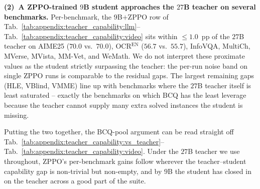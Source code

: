 \textbf{(2)~A ZPPO-trained $9$B student approaches the $27$B teacher on several benchmarks.} Per-benchmark, the $9$B$+$ZPPO row of Tab.~\ref{tab:appendix:teacher_capability:llm}--Tab.~\ref{tab:appendix:teacher_capability:video} sits within ${\le}1.0$~pp of the $27$B teacher on AIME25 ($70.0$ vs.\ $70.0$), OCR$^\text{EN}$ ($56.7$ vs.\ $55.7$), InfoVQA, MultiCh, MVerse, MVista, MM-Vet, and WeMath. We do not interpret these proximate values as the student strictly surpassing the teacher: the per-run noise band on single ZPPO runs is comparable to the residual gaps. The largest remaining gaps (HLE, VBlind, VMME) line up with benchmarks where the $27$B teacher itself is least saturated -- exactly the benchmarks on which BCQ has the least leverage because the teacher cannot supply many extra solved instances the student is missing.

Putting the two together, the BCQ-pool argument can be read straight off Tab.~\ref{tab:appendix:teacher_capability:vs_teacher}--Tab.~\ref{tab:appendix:teacher_capability:video}. Under the $27$B teacher we use throughout, ZPPO's per-benchmark gains follow wherever the teacher--student capability gap is non-trivial but non-empty, and by $9$B the student has closed in on the teacher across a good part of the suite.
